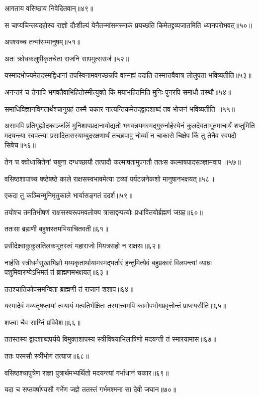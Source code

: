 आगताय वसिष्ठाय निवेदितवान्॥४९॥

स चाप्यचिन्तयदहोस्य राज्ञो दौःशील्यं येनैतन्मांसमस्माकं प्रयच्छति किमेतद्द्रव्यजातमिति
ध्यानपरोभवत्॥५०॥

अपश्यच्च तन्मांसम्मानुषम्॥५१॥

अतः क्रोधकलुषीकृतचेता राजनि सापमुत्ससर्ज॥५२॥

यस्मादभोज्यमेतदस्मद्विधानां तपस्विनामवगच्छन्नपि वान्मह्यं ददाति तस्मात्तवैवात्र लोलुपता
भविष्यतीति॥५३॥

अनन्तरं च तेनापि भगवतैवाभिहितोस्मीत्युक्ते किं मयाभहितमिति मुनिः पुनरपि समाधौ तस्थौ॥५४॥

समाधिविज्ञानविगतार्थश्चानुग्रहं तस्मै चकार नात्यन्तिकमेतद्द्वादशाब्दं तव भोजनं भविष्यतीति
॥५५॥

असावपि प्रतिगृह्योदकाञ्जलिं मुनिशापप्रदानायोद्यतो भगवन्नयमस्मद्गुरुर्नार्हस्येनं
कुलदेवताभूतमाचार्यं शप्तुमिति मदयन्त्या स्वपत्न्या प्रसादितःसस्याम्बुदरक्षणार्थं तच्छापांवु
नोर्व्यां न चाकासे चिक्षेप किं तु तेनैव स्वपदौ सिषेच॥५६॥

तेन च क्वोधाश्रितेनां चबुना दग्धच्छायौ तत्पादौ कल्माषतामुपगतौ ततःस कल्माषपादसञ्ज्ञामवाप
॥५७॥

वसिष्ठशापाच्च षष्ठेषष्ठे काले राक्षसस्वभावमेत्या टव्यां पर्यटन्ननेकशो मानुषानभक्षयत्॥५८॥

एकदा तु कञ्चिन्मुनिमृतुकाले भार्यासङ्गतं ददर्श॥५९॥

तयोश्च तमतिभीषणं राक्षसस्वरूपमवलोक्य त्रासाद्दम्पत्योः प्रधावितयोर्ब्रह्मणं जग्रह॥६०॥

ततःसा ब्रह्मणी बहुशस्तमभियाचितवती॥६१॥

प्रसीदेक्ष्वाकुकुलतिलकभूतस्त्वं महाराजो मियत्रसहो न राक्षसः॥६२॥

नार्हसि स्त्रीधर्मसुखाभिज्ञो मय्यकृतार्थायामस्मद्भर्तारं हन्तुमित्येवं बहुप्रकारं विलपन्त्यां
व्याघ्रः पशुमिवारण्येऽभिमतं तं ब्राह्मणमभक्षयत्॥६३॥

ततश्चातिकोपसमन्विता ब्राह्मणी तं राजानं शशाप॥६४॥

यस्मादेवं मय्यतृषप्तायां त्वयायं मत्पतिर्भक्षितः तस्मात्त्वमपि कामोपभोगप्रवृत्तोन्तं
प्राप्स्यसीति॥६५॥

शप्त्वा चैव साग्निं प्रविवेश॥६६॥

ततस्तस्य द्वादशाब्दपर्यये विमुक्तशापस्य स्त्रीविषयाभिलाषिणो मदयन्ती तं स्मारयामास॥६७॥

ततः परमसौ स्त्रीभोगं तत्याज॥६८॥

वसिष्ठश्चापुत्रेण राज्ञा पुत्रार्थमभ्यर्थितो मदयन्त्यां गर्भाधानं चकार॥६९॥

यदा च सप्तवर्षाण्यसौ गर्भेण जज्ञे ततस्तं गर्भमश्मना सा देवी जघान॥७०॥

